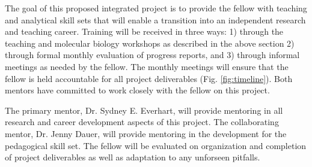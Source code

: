 \documentclass[12pt,letterpaper]{article}
\begin{document}
The goal of this proposed integrated project is to provide the fellow with teaching and analytical skill sets that will enable a transition into an independent research and teaching career. 
Training will be received in three ways: 1) through the teaching and molecular biology workshops as described in the above section 2) through formal monthly evaluation of progress reports, and 3) through informal meetings as needed by the fellow. 
The monthly meetings will ensure that the fellow is held accountable for all project deliverables (Fig. \ref{fig:timeline}). 
Both mentors have committed to work closely with the fellow on this project.

The primary mentor, Dr. Sydney E. Everhart, will provide mentoring in all research and career development aspects of this project.
The collaborating mentor, Dr. Jenny Dauer, will provide mentoring in the development for the pedagogical skill set.
The fellow will be evaluated on organization and completion of project deliverables as well as adaptation to any unforseen pitfalls. 







\end{document}
